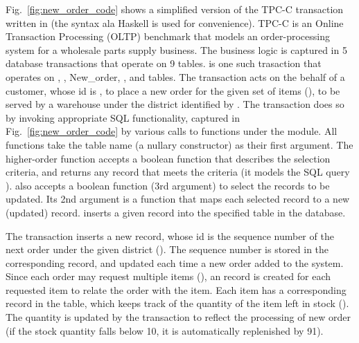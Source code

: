 Fig.~\ref{fig:new_order_code} shows a simplified version of the TPC-C
 transaction written in \txnimp (the  syntax ala
Haskell is used for convenience). TPC-C is an Online Transaction
Processing (OLTP) benchmark that models an order-processing system for
a wholesale parts supply business. The business logic is captured in 5
database transactions that operate on 9 tables.  is one
such trasaction that operates on , ,
{New\_order}, , and  tables. The transaction
acts on the behalf of a customer, whose id is , to place a
new order for the given set of items (), to be served by
a warehouse under the district identified by . The
transaction does so by invoking appropriate SQL functionality,
captured in Fig.~\ref{fig:new_order_code} by various calls to
functions under the  module. All  functions take the
table name (a nullary constructor) as their first argument. The
higher-order  function accepts a boolean function that
describes the selection criteria, and returns any record that meets
the criteria (it models the SQL query \C{SELECT \ldots\xspace LIMIT
1}).  also accepts a boolean function (3rd argument) to
select the records to be updated. Its 2nd argument is a function that
maps each selected record to a new (updated) record. 
inserts a given record into the specified table in the database.

The  transaction inserts a new  record, whose
id is the sequence number of the next order under the given district
(). The sequence number is stored in the corresponding
 record, and updated each time a new order added to the
system. Since each order may request multiple items (),
an  record is created for each requested item to relate
the order with the item. Each item has a corresponding record in the
 table, which keeps track of the quantity of the item left in
stock (). The quantity is updated by the transaction to
reflect the processing of new order (if the stock quantity falls below
10, it is automatically replenished by 91).

